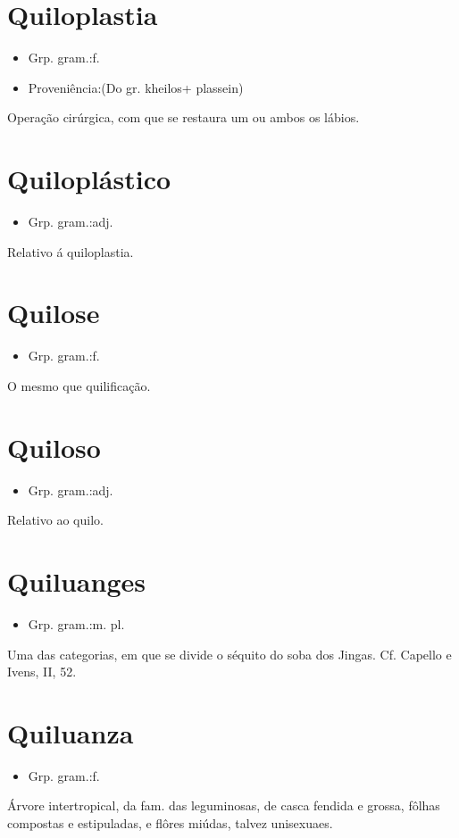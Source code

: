 \section{Quiloplastia}
\begin{itemize}
\item {Grp. gram.:f.}
\end{itemize}
\begin{itemize}
\item {Proveniência:(Do gr. \textunderscore kheilos\textunderscore  + \textunderscore plassein\textunderscore )}
\end{itemize}
Operação cirúrgica, com que se restaura um ou ambos os lábios.
\section{Quiloplástico}
\begin{itemize}
\item {Grp. gram.:adj.}
\end{itemize}
Relativo á \textunderscore quiloplastia\textunderscore .
\section{Quilose}
\begin{itemize}
\item {Grp. gram.:f.}
\end{itemize}
O mesmo que \textunderscore quilificação\textunderscore .
\section{Quiloso}
\begin{itemize}
\item {Grp. gram.:adj.}
\end{itemize}
Relativo ao quilo.
\section{Quiluanges}
\begin{itemize}
\item {Grp. gram.:m. pl.}
\end{itemize}
Uma das categorias, em que se divide o séquito do soba dos Jingas. Cf. Capello e Ivens, II, 52.
\section{Quiluanza}
\begin{itemize}
\item {Grp. gram.:f.}
\end{itemize}
Árvore intertropical, da fam. das leguminosas, de casca fendida e grossa, fôlhas compostas e estipuladas, e flôres miúdas, talvez unisexuaes.
